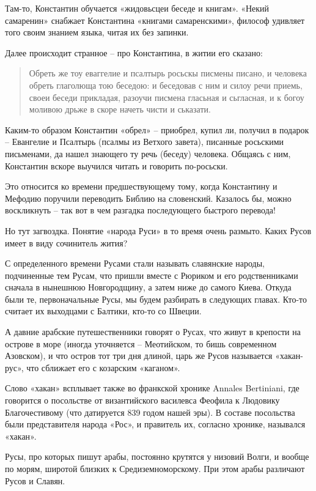Там-то, Константин обучается «жидовьсцеи беседе и книгам». «Некий самаренин» снабжает Константина «книгами самаренскими», философ удивляет того своим знанием языка, читая их без запинки.

Далее происходит странное – про Константина, в житии его сказано\cite{teodorov01}:

\begin{quotation}
Обреть же тоу еваггелие и псалтырь росьскы писмены писано, и человека обреть глаголюща тою беседою: и беседовав с ним и силоу речи приемь, своеи беседи прикладая, разоучи писмена гласьная и сьгласная, и к богоу моливою дрьже в скоре начеть чисти и ськазати.
\end{quotation}

Каким-то образом Константин «обрел» – приобрел, купил ли, получил в подарок – Евангелие и Псалтырь (псалмы из Ветхого завета), писанные росьскими письменами, да нашел знающего ту речь (беседу) человека. Общаясь с ним, Константин вскоре выучился читать и говорить по-росьски.

Это относится ко времени предшествующему тому, когда Константину и Мефодию поручили переводить Библию на словенский. Казалось бы, можно воскликнуть – так вот в чем разгадка последующего быстрого перевода!

Но тут загвоздка. Понятие «народа Руси» в то время очень размыто. Каких Русов имеет в виду сочинитель жития? 

С определенного времени Русами стали называть славянские народы, подчиненные тем Русам, что пришли вместе с Рюриком и его родственниками сначала в нынешнюю Новгородщину, а затем ниже до самого Киева. Откуда были те, первоначальные Русы, мы будем разбирать в следующих главах. Кто-то считает их выходцами с Балтики, кто-то со Швеции. 

А давние арабские путешественники говорят о Русах, что живут в крепости на острове в море (иногда уточняется – Меотийском, то бишь современном Азовском), и что остров тот три дня длиной, царь же Русов называется «хакан-рус», что сближает его с козарским «каганом». 

Слово «хакан» всплывает также во франкской хронике Annales Bertiniani, где говорится о посольстве от византийского василевса Феофила к Людовику Благочестивому (что датируется 839 годом нашей эры). В составе посольства были представителя народа «Рос», и правитель их, согласно хронике, назывался «хакан». 

Русы, про которых пишут арабы, постоянно крутятся у низовий Волги, и вообще по морям, широтой близких к Средиземноморскому. При этом арабы различают Русов и Славян.

